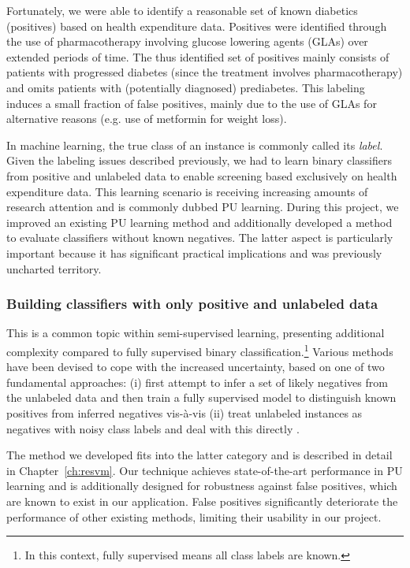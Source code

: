Fortunately, we were able to identify a reasonable set of known diabetics (positives) based on health expenditure data. Positives were identified through the use of pharmacotherapy involving glucose lowering agents (GLAs) over extended periods of time. The thus identified set of positives mainly consists of patients with progressed diabetes (since the treatment involves pharmacotherapy) and omits patients with (potentially diagnosed) prediabetes. This labeling induces a small fraction of false positives, mainly due to the use of GLAs for alternative reasons (e.g. use of metformin for weight loss).

In machine learning, the true class of an instance is commonly called its \emph{label}. Given the labeling issues described previously, we had to learn binary classifiers from positive and unlabeled data to enable screening based exclusively on health expenditure data. This learning scenario is receiving increasing amounts of research attention and is commonly dubbed PU learning. During this project, we improved an existing PU learning method \citep{mordelet2014bagging} and additionally developed a method to evaluate classifiers without known negatives. The latter aspect is particularly important because it has significant practical implications and was previously uncharted territory.

\subsubsection{Building classifiers with only positive and unlabeled data} 
This is a common topic within semi-supervised learning, presenting additional complexity compared to fully supervised binary classification.\footnote{In this context, fully supervised means all class labels are known.} Various methods have been devised to cope with the increased uncertainty, based on one of two fundamental approaches:
(i) first attempt to infer a set of likely negatives from the unlabeled data and then train a fully supervised model to distinguish known positives from inferred negatives \citep{liu02partially,Yu:2005:SCM:1108759.1108762,Li03learningto} vis-\`a-vis (ii) treat unlabeled instances as negatives with noisy class labels and deal with this directly \citep{Elkan:2008:LCO:1401890.1401920,Lee03learningwith,Liu:2003:BTC:951949.952139,mordelet2014bagging,Liu:2005:PSC:2138033.2138052}.

The method we developed fits into the latter category and is described in detail in Chapter~\ref{ch:resvm}. Our technique achieves state-of-the-art performance in PU learning and is additionally designed for robustness against false positives, which are known to exist in our application. False positives significantly deteriorate the performance of other existing methods, limiting their usability in our project.

